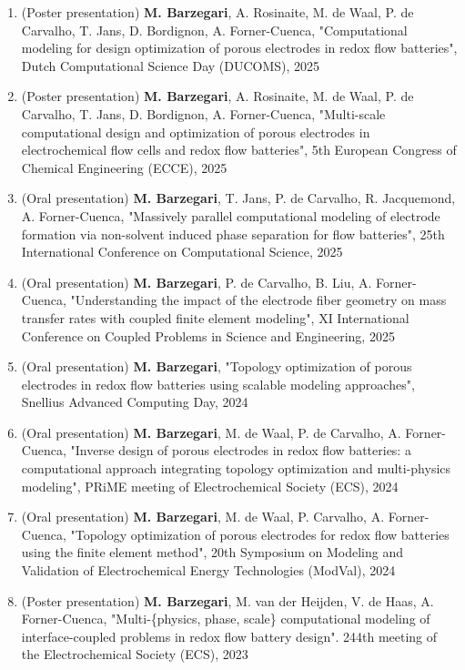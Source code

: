 \documentclass{cv}
\begin{document}
\begin{enumerate}[itemsep=-0.2ex]
\item
(Poster presentation) \textbf{M. Barzegari}, A. Rosinaite, M. de Waal, P. de Carvalho, T. Jans, D. Bordignon, A. Forner-Cuenca, "Computational modeling for design optimization of porous electrodes in redox flow batteries", Dutch Computational Science Day (DUCOMS), 2025
\item
(Poster presentation) \textbf{M. Barzegari}, A. Rosinaite, M. de Waal, P. de Carvalho, T. Jans, D. Bordignon, A. Forner-Cuenca, "Multi-scale computational design and optimization of porous electrodes in electrochemical flow cells and redox flow batteries", 5th European Congress of Chemical Engineering (ECCE), 2025
\item 
(Oral presentation) 
\textbf{M. Barzegari}, T. Jans, P. de Carvalho, R. Jacquemond, A. Forner-Cuenca, "Massively parallel computational modeling of electrode formation via non-solvent induced phase separation for flow batteries", 25th International Conference on Computational Science, 2025
\item 
(Oral presentation) 
\textbf{M. Barzegari}, P. de Carvalho, B. Liu, A. Forner-Cuenca, "Understanding the impact of the electrode fiber geometry on mass transfer rates with coupled finite element modeling", XI International Conference on Coupled Problems in Science and Engineering, 2025
\item 
(Oral presentation) 
\textbf{M. Barzegari}, "Topology optimization of porous electrodes in redox flow batteries using scalable modeling approaches", Snellius Advanced Computing Day, 2024
\item 
(Oral presentation) 
\textbf{M. Barzegari}, M. de Waal, P. de Carvalho, A. Forner-Cuenca, "Inverse design of porous electrodes in redox flow batteries: a computational approach integrating topology optimization and multi-physics modeling", PRiME meeting of Electrochemical Society (ECS), 2024
\item
(Oral presentation) 
\textbf{M. Barzegari}, M. de Waal, P. Carvalho, A. Forner-Cuenca, "Topology optimization of porous electrodes for redox flow batteries using the finite element method", 20th Symposium on Modeling and Validation of Electrochemical Energy Technologies (ModVal), 2024
\item
(Poster presentation) 
\textbf{M. Barzegari}, M. van der Heijden, V. de Haas, A. Forner-Cuenca,
"Multi-\{physics, phase, scale\} computational modeling of interface-coupled problems in redox flow battery design". 244th meeting of the Electrochemical Society (ECS), 2023

\end{enumerate}
\end{document}
